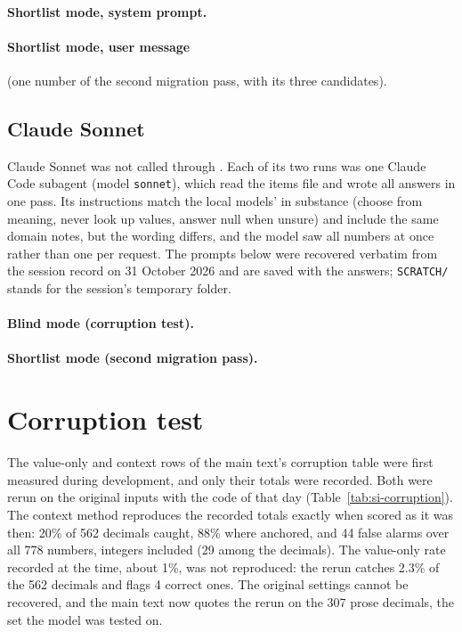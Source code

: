 \documentclass[11pt]{article}
\begin{document}
\paragraph{Shortlist mode, system prompt.}


\paragraph{Shortlist mode, user message} (one number of the second migration pass, with its three
candidates).


\subsection{Claude Sonnet}

Claude Sonnet was not called through \pv{}. Each of its two runs was one Claude Code subagent
(model \texttt{sonnet}), which read the items file and wrote all answers in one pass. Its
instructions match the local models' in substance (choose from meaning, never look up values,
answer null when unsure) and include the same domain notes, but the wording differs, and the
model saw all numbers at once rather than one per request. The prompts below were recovered
verbatim from the session record on 31 October 2026 and are saved with the answers;
\texttt{SCRATCH/} stands for the session's temporary folder.

\paragraph{Blind mode (corruption test).}


\paragraph{Shortlist mode (second migration pass).}


\section{Corruption test}
\label{si:corruption}

The value-only and context rows of the main text's corruption table were first measured during
development, and only their totals were recorded. Both were rerun on the original inputs with the
code of that day (Table~\ref{tab:si-corruption}). The context method reproduces the recorded
totals exactly when scored as it was then: 20\% of 562 decimals caught, 88\% where anchored,
and 44 false alarms over all 778 numbers, integers included (29 among the decimals). The
value-only rate recorded at the time, about 1\%, was not reproduced: the rerun catches 2.3\% of
the 562 decimals and flags 4 correct ones. The original settings cannot be recovered, and the
main text now quotes the rerun on the 307 prose decimals, the set the model was tested on.
\end{document}
